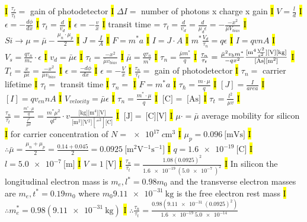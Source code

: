 \documentclass[fontsize=3]{scrartcl}
\begin{document}
\hl{I}
$\frac{\tau_r}{\tau_{t}} =$ gain of photodetector
\hl{I}
$\Delta I = $ number of photons x charge x gain
\hl{I}
$V= \frac{l}{d}$
\hl{I}
$\epsilon = -\frac{d\phi}{dx}$
\hl{I}
$\tau_t = \frac{d}{v_d}$
\hl{I}
$\epsilon = -\frac{v}{x}$
\hl{I}
transit time = $\tau_t = \frac{d}{v_d} = \frac{d}{\mu_d \epsilon} = -\frac{-x^2}{\bar{\mu} V_{bias}}$
\hl{I}
$Si \rightarrow \mu = \bar \mu - \frac{\mu_n \cdot \mu_p}{2}$
\hl{I}
$J = \frac{I}{A}$
\hl{I}
$F=m^*a$
\hl{I}
$I = J \cdot A$
\hl{I}
$m^* \frac{V_d}{\tau_n} = q\epsilon$
\hl{I}
$I=qvnA$
\hl{I}
$V_s = \frac{q \tau_n}{m_*}\cdot \epsilon$
\hl{I}
$v_d = \bar \mu \epsilon$
\hl{I}
$\tau_t = \frac{-x^2}{\bar \mu v_{bias}}$
\hl{I}
$\bar \mu = \frac{q \tau_n}{m^*}$
\hl{I}
$\tau_{n} = \frac{\bar{\mu} m^*}{q}$
\hl{I}
$\frac{\tau_n}{\tau_t}=\frac{\bar \mu^2 v_b m^*}{-q x^2} \frac{ \SI{}{ [ \meter^4 \frac{\volt^2}{\second^2} ][ \volt ][ \kilogram ]} } { \SI{}{ [ \ampere \second ][ \meter^2 ]} }$
\hl{I}
$T_t = \frac{x}{\bar{\mu} \epsilon }=\frac{-x^2}{\bar{\mu} v_{bias} }$
\hl{I}
$\epsilon = \frac{-d \phi}{dx}$
\hl{I}
$\epsilon = -\frac{V}{x}$
\hl{I}
$\frac{\tau_n}{\tau_t} =$ gain of photodetector
\hl{I}
$\tau_n =$ carrier lifetime
\hl{I}
$\tau_t =$ transit time
\hl{I}
$\tau_{n} = $
\hl{I}
$F = m^* a$
\hl{I}
$\tau_{\hbar} = \frac{m \cdot \mu}{q}$
\hl{I}
$[J] = \frac{I}{area}$
\hl{I}
$[I] = q v_{en} n A$
\hl{I}
$V_{velocity} =\bar{\mu} \epsilon$
\hl{I}
$\tau_n = \frac{m^* \cdot \mu}{q}$
\hl{I}
$\SI{}{[\coulomb]}$ = $\SI{}{[\ampere \second]}$
\hl{I}
$\tau_t = \frac{l^2}{\mu v}$
\hl{I}
$\frac{\tau_n}{\tau_t} = \frac{\frac{m^* \cdot \mu}{q}}{\frac{l^2}{\mu v}} = \frac{m^* \mu^2}{q l^2} \cdot v \frac{ \SI{} {[\kilogram] [\meter^4] [\volt]} }{\SI{}{ [\meter^2] [ \volt^2 ] [ \second^2 ] [ \coulomb ] }} $
\hl{I}
$\SI{}{[\joule]}= \SI{}{ [\coulomb] [\volt] }$
\hl{I}
$\mu \cdot = \bar \mu$ average mobility for silicon
\hl{I}
for carrier concentration of $N = \SI{e17}{c \meter^3}$
\hl{I}
$\mu_p = 0.096 \SI{}{[ \meter \volt \second ]}$
\hl{I}
$\therefore \bar{\mu} = \frac{\mu_n + \mu_p}{2} = \frac{0.14 + 0.045}{2} = 0.0925 \SI{}{[ \meter^2 \volt^{-1} \second^{-1}]}$
\hl{I}
$q = \SI{1.6e-19}{[ \coulomb ]}$
\hl{I}
$l = \SI{5.0e-7}{ [\meter] }$
\hl{I}
$V = 1\SI{}{[ \volt ]}$
\hl{I}
$\frac{\tau_n}{\tau_t} = \frac{1.08(0.0925)^2}{\SI{1.6e-19}{} (\SI{5.0e-7}{} )^2 }$
\hl{I}
In silicon the longitudinal electron mass is $m_e, l^* = 0.98m_0$ and the transverse electron masses are $m_e,t^* = 0.19m_0$ where $m_0 \SI{9.11e-31}{\kilogram}$ is the free electron rest mass
\hl{I}
$\therefore m_e^* = 0.98(\SI{9.11e-31}{\kilogram})$
\hl{I}
$\therefore \frac{\tau_n}{\tau_t} = \frac{ 0.98( \SI{9.11e-31}{} (0.0925)^2 )}  { \SI{1.6e-19}{}   \SI{5.0e-14}{} }$
\end{document}
